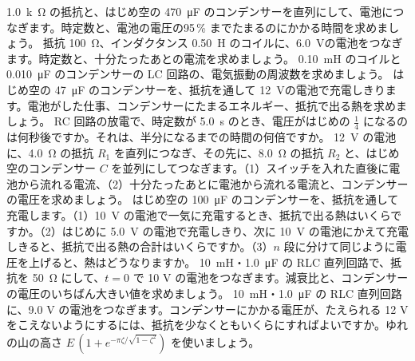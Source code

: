 \bkendproblems
{}
\bkproblem \qty{1.0}{k\ohm} の抵抗と、はじめ空の \qty{470}{\micro F} のコンデンサーを直列にして、電池につなぎます。時定数と、電池の電圧の95\,\% までたまるのにかかる時間を求めましょう。
\bkproblem 抵抗 \qty{100}{\ohm}、インダクタンス \qty{0.50}{H} のコイルに、\qty{6.0}{V}の電池をつなぎます。時定数と、十分たったあとの電流を求めましょう。
\bkproblem \qty{0.10}{mH} のコイルと \qty{0.010}{\micro F} のコンデンサーの LC 回路の、電気振動の周波数を求めましょう。
\bkproblem はじめ空の \qty{47}{\micro F} のコンデンサーを、抵抗を通して \qty{12}{V}の電池で充電しきります。電池がした仕事、コンデンサーにたまるエネルギー、抵抗で出る熱を求めましょう。
\bkproblem RC 回路の放電で、時定数が \qty{5.0}{s} のとき、電圧がはじめの $\tfrac14$ になるのは何秒後ですか。それは、半分になるまでの時間の何倍ですか。
\bkproblem \qty{12}{V} の電池に、\qty{4.0}{\ohm} の抵抗 $R_1$ を直列につなぎ、その先に、\qty{8.0}{\ohm} の抵抗 $R_2$ と、はじめ空のコンデンサー $C$ を並列にしてつなぎます。（1）スイッチを入れた直後に電池から流れる電流、（2）十分たったあとに電池から流れる電流と、コンデンサーの電圧を求めましょう。
\bkproblem はじめ空の \qty{100}{\micro F} のコンデンサーを、抵抗を通して充電します。（1）\qty{10}{V} の電池で一気に充電するとき、抵抗で出る熱はいくらですか。（2）はじめに \qty{5.0}{V} の電池で充電しきり、次に \qty{10}{V} の電池にかえて充電しきると、抵抗で出る熱の合計はいくらですか。（3）$n$ 段に分けて同じように電圧を上げると、熱はどうなりますか。
\bkproblem \qty{10}{mH}・\qty{1.0}{\micro F} の RLC 直列回路で、抵抗を \qty{50}{\ohm} にして、$t=0$ で 10 V の電池をつなぎます。減衰比と、コンデンサーの電圧のいちばん大きい値を求めましょう。
\bkproblem \qty{10}{mH}・\qty{1.0}{\micro F} の RLC 直列回路に、9.0 V の電池をつなぎます。コンデンサーにかかる電圧が、たえられる 12 V をこえないようにするには、抵抗を少なくともいくらにすればよいですか。ゆれの山の高さ $E\,(1+e^{-\pi\zeta/\sqrt{1-\zeta^2}})$ を使いましょう。

